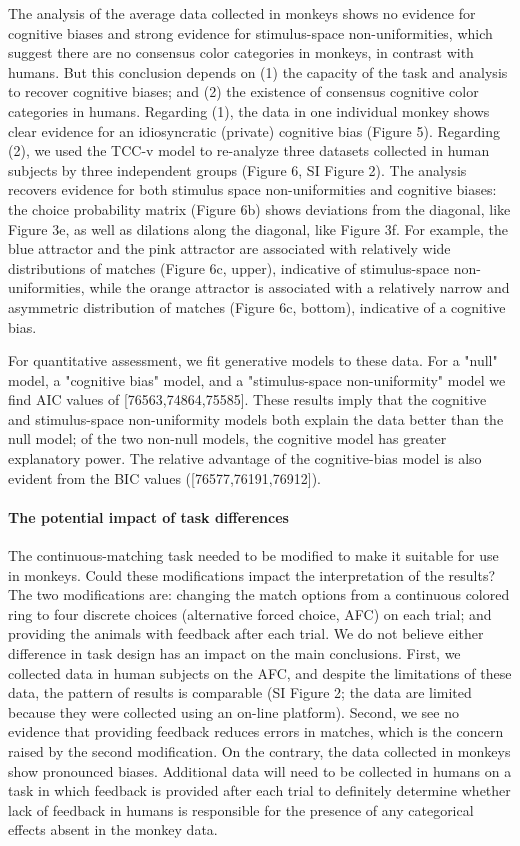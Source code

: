 \documentclass[9pt,biorxiv,lineno,onehalfspacing]{lapreprint}
\begin{document}
\begin{refsection}
The analysis of the average data collected in monkeys shows no evidence for cognitive biases and strong evidence for stimulus-space non-uniformities, which suggest there are no consensus color categories in monkeys, in contrast with humans. 
But this conclusion depends on (1) the capacity of the task and analysis to recover cognitive biases; and (2) the existence of consensus cognitive color categories in humans. 
Regarding (1), the data in one individual monkey shows clear evidence for an idiosyncratic (private) cognitive bias (Figure 5). 
Regarding (2), we used the TCC-v model to re-analyze three datasets collected in human subjects by three independent groups (Figure 6, SI Figure 2). 
The analysis recovers evidence for both stimulus space non-uniformities and cognitive biases: the choice probability matrix (Figure 6b) shows deviations from the diagonal, like Figure 3e, as well as dilations along the diagonal, like Figure 3f. For example, the blue attractor and the pink attractor are associated with relatively wide distributions of matches (Figure 6c, upper), indicative of stimulus-space non-uniformities, while the orange attractor is associated with a relatively narrow and asymmetric distribution of matches (Figure 6c, bottom), indicative of a cognitive bias.  

For quantitative assessment, we fit generative models to these data. 
For a "null" model, a "cognitive bias" model, and a "stimulus-space non-uniformity" model we find AIC values of [76563,74864,75585]. 
These results imply that the cognitive and stimulus-space non-uniformity models both explain the data better than the null model; of the two non-null models, the cognitive model has greater explanatory power. 
The relative advantage of the cognitive-bias model is also evident from the BIC values ([76577,76191,76912]).

\paragraph{The potential impact of task differences}

The continuous-matching task needed to be  modified to make it suitable for use in monkeys. Could these modifications impact the interpretation of the results? 
The two modifications are: changing the match options from a continuous colored ring to four discrete choices (alternative forced choice, AFC) on each trial; and providing the animals with feedback after each trial. 
We do not believe either difference in task design has an impact on the main conclusions. 
First, we collected data in human subjects on the AFC, and despite the limitations of these data, the pattern of results is comparable (SI Figure 2; the data are limited because they were collected using an on-line platform). 
Second, we see no evidence that providing feedback reduces errors in matches, which is the concern raised by the second modification. 
On the contrary, the data collected in monkeys show pronounced biases. Additional data will need to be collected in humans on a task in which feedback is provided after each trial to definitely determine whether lack of feedback in humans is responsible for the presence of any categorical effects absent in the monkey data. 


\end{refsection}
\end{document}
